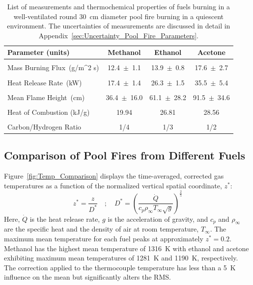 \documentclass[12pt]{article}
\begin{document}
\begin{table}[!ht]
\caption{List of measurements and thermochemical properties of fuels burning in a well-ventilated round 30~cm diameter pool fire burning in a quiescent environment. The uncertainties of measurements are discussed in detail in Appendix~\ref{sec:Uncertainty_Pool_Fire_Parameters}.}
\label{tab:Pool_Fire_Parameters_Table}
\centering
	\footnotesize
	\begin{tabular}{lccc}
\hline
\textbf{Parameter (units)} &\textbf{Methanol}& \textbf{Ethanol}& \textbf{Acetone}\\
\hline
\\[0.01cm]
Mass Burning Flux~(\si{g/{m^2 s}})		        &	12.4~$\pm$~1.1		&	13.9~$\pm$~0.8	&	17.6~$\pm$~2.7\\
\\[0.01cm]
Heat Release Rate~(\si{kW})		            	&	17.4~$\pm$~1.4		&	26.3~$\pm$~1.5	&	35.5~$\pm$~5.4\\
\\[0.01cm]
Mean Flame Height~(\si{cm})			            &	36.4~$\pm$~16.0		&	61.1~$\pm$~28.2	&	91.5~$\pm$~34.6\\
\\[0.01cm]
Heat of Combustion (kJ/g)~\cite{SFPE}			&	19.94				&	26.81			&	28.56			\\	
\\[0.01cm]
Carbon/Hydrogen Ratio				         	&	1/4			&	1/3		&	1/2			\\
\hline
\end{tabular}
\end{table}

\subsection{Comparison of Pool Fires from Different Fuels}
\label{ssec:Fuel_comp}

Figure~\ref{fig:Temp_Comparison} displays the time-averaged, corrected gas temperatures as a function of the normalized vertical spatial coordinate, $z^*$:
\begin{equation}\label{eq:Z_Star}
z^*=\frac{z}{D^*}  \quad ; \quad  D^* = \left(\frac{\dot{Q}}{c_{p}\rho_\infty T_\infty \sqrt{g}}\right)^{\frac{2}{5}}
\end{equation}
Here, $\dot{Q}$ is the heat release rate, $g$ is the acceleration of gravity, and $c_p$ and $\rho_\infty$ are the specific heat and the density of air at room temperature, $T_\infty$. The maximum mean temperature for each fuel peaks at approximately $z^*=0.2$. Methanol has the highest mean temperature of 1316~K with ethanol and acetone exhibiting maximum mean temperatures of 1281~K and 1190~K, respectively. The correction applied to the thermocouple temperature has less than a 5~K influence on the mean but significantly alters the RMS.
\end{document}
